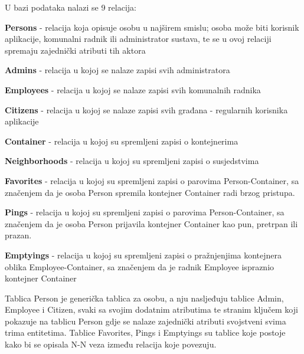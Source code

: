 				U bazi podataka nalazi se 9 relacija:
				\begin{packed_item}
					\item \textbf{Persons} - relacija koja opisuje osobu u najširem smislu; osoba može biti korisnik aplikacije, komunalni radnik ili administrator sustava, te se u ovoj relaciji spremaju zajednički atributi tih aktora
					\item \textbf{Admins} - relacija u kojoj se nalaze zapisi svih administratora
					\item \textbf{Employees} - relacija u kojoj se nalaze zapisi svih komunalnih radnika
					\item \textbf{Citizens} - relacija u kojoj se nalaze zapisi svih građana - regularnih korisnika aplikacije
					\item \textbf{Container} - relacija u kojoj su spremljeni zapisi o kontejnerima
					\item \textbf{Neighborhoods} - relacija u kojoj su spremljeni zapisi o susjedstvima
					\item \textbf{Favorites} - relacija u kojoj su spremljeni zapisi o parovima Person-Container, sa značenjem da je osoba Person spremila kontejner Container radi brzog pristupa.
					\item \textbf{Pings} - relacija u kojoj su spremljeni zapisi o parovima Person-Container, sa značenjem da je osoba Person prijavila kontejner Container kao pun, pretrpan ili prazan.
					\item \textbf{Emptyings} - relacija u kojoj su spremljeni zapisi o pražnjenjima kontejnera oblika Employee-Container, sa značenjem da je radnik Employee ispraznio kontejner Container
				\end{packed_item}
			
				Tablica Person je generička tablica za osobu, a nju nasljeđuju tablice Admin, Employee i Citizen, svaki sa svojim dodatnim atributima te stranim ključem koji pokazuje na tablicu Person gdje se nalaze zajednički atributi svojstveni svima trima entitetima.	Tablice Favorites, Pings i Emptyings su tablice koje postoje kako bi se opisala N-N veza između relacija koje povezuju.


